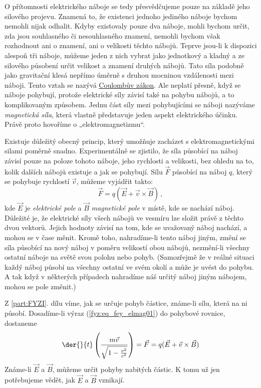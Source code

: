     O přítomnosti elektrického náboje se tedy přesvědčujeme pouze na základě jeho silového projevu.
    Znamená to, že existenci jednoho jediného náboje bychom nemohli nijak odhalit. Kdyby
    existovaly pouze dva náboje, mohli bychom určit, zda jsou souhlasného či nesouhlasného
    znamení, nemohli bychom však rozhodnout ani o znamení, ani o velikosti těchto nábojů. Teprve
    jsou-li k dispozici alespoň tři náboje, můžeme jeden z nich vybrat jako jednotkový a kladný a
    ze silového působení určit velikost a znamení druhých nábojů. Tato síla podobně jako gravitační 
    klesá nepřímo úměrně s druhou mocninou vzdálenosti mezi náboji. Tento vztah se nazývá 
    \hyperlink{fyz:IIchapIVsecII}{Coulombův zákon}. Ale neplatí přesně, když se náboje pohybují, 
    protože elektrické síly závisí také na pohybu nábojů, a to komplikovaným způsobem. Jednu část 
    síly mezi pohybujícími se náboji nazýváme \emph{magnetická síla}, která vlastně představuje 
    jeden aspekt elektrického účinku. Právě proto hovoříme o „elektromagnetizmu“.
    
    Existuje důležitý obecný princip, který umožňuje zacházet s elektromagnetickými silami poměrně 
    snadno. Experimentálně se zjistilo, že síla působící na náboj závisí pouze na poloze tohoto 
    náboje, jeho rychlosti a velikosti, bez ohledu na to, kolik dalších nábojů existuje a jak se 
    pohybují. Sílu \(\vec{F}\) působící na náboj \(q\), který se pohybuje rychlostí \(\vec{v}\), 
    můžeme vyjádřit takto:
    \begin{equation}\label{fyz:eq_fey_elmag01}
      \boxed{\vec{F} = q(\vec{E}+\vec{v}\times\vec{B})}\, ,
    \end{equation}
    kde \(\vec{E}\) je \emph{elektrické pole} a \(\vec{B}\) \emph{magnetické pole} v místě, kde se 
    nachází náboj. Důležité je, že elektrické síly všech nábojů ve vesmíru lze složit právě z 
    těchto dvou vektorů. Jejich hodnoty závisí na tom, kde se uvažovaný náboj nachází, a mohou se v 
    čase měnit. Kromě toho, nahradíme-li tento náboj jiným, změní se síla působící na nový náboj v 
    poměru velikostí obou nábojů, nezmění-li všechny ostatní náboje na světě svou polohu nebo 
    pohyb. (Samozřejmě že v reálné situaci každý náboj působí na všechny ostatní ve svém okolí a 
    může je uvést do pohybu. A tak když v některých případech nahradíme náš určitý náboj jiným 
    nábojem, mohou se pole změnit.)
    
    Z \ref{part:FYZI}. dílu víme, jak se určuje pohyb částice, známe-li sílu, která na ni působí. 
    Dosadíme-li výraz (\ref{fyz:eq_fey_elmag01}) do pohybové rovnice, dostaneme
    \begin{equation}\label{fyz:eq_fey_elmag02}
      \der{ }{t}\left(\frac{m\vec{v}}{\sqrt{1-\frac{v^2}{c^2}}}\right) = \vec{F} =
      q(\vec{E}+\vec{v}\times\vec{B})
    \end{equation}
    Známe-li \(\vec{E}\) a \(\vec{B}\), můžeme určit pohyby nabitých částic. K tomu už jen 
    potřebujeme vědět, jak \(\vec{E}\) a \(\vec{B}\) vznikají.
    
